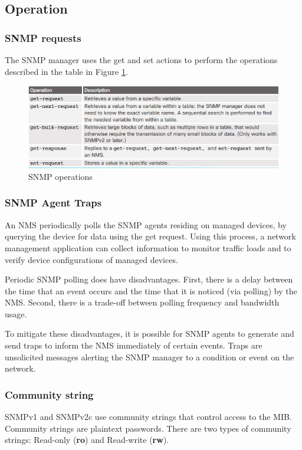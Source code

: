\subsection{Operation}
\subsubsection{SNMP requests}
The SNMP manager uses the get and set actions to perform the operations described in the table in Figure \ref{SNMPoperation}.
	\begin{figure}[hbtp]
	\caption{SNMP operations}\label{SNMPoperation}
	\centering
	\includegraphics[scale=1]{pictures/SNMPoperation.PNG}
	\end{figure}
\subsubsection{SNMP Agent Traps}
An NMS periodically polls the SNMP agents residing on managed devices, by querying the device for data using the get request. Using this process, a network management application can collect information to monitor traffic loads and to verify device configurations of managed devices.\par 
Periodic SNMP polling does have disadvantages. First, there is a delay between the time that an event occurs and the time that it is noticed (via polling) by the NMS. Second, there is a trade-off between polling frequency and bandwidth usage.\par 
To mitigate these disadvantages, it is possible for SNMP agents to generate and send traps to inform the NMS immediately of certain events. Traps are unsolicited messages alerting the SNMP manager to a condition or event on the network. 
\subsubsection{Community string}
SNMPv1 and SNMPv2c use community strings that control access to the MIB. Community strings are plaintext passwords. There are two types of community strings: Read-only (\textbf{ro}) and Read-write (\textbf{rw}).
